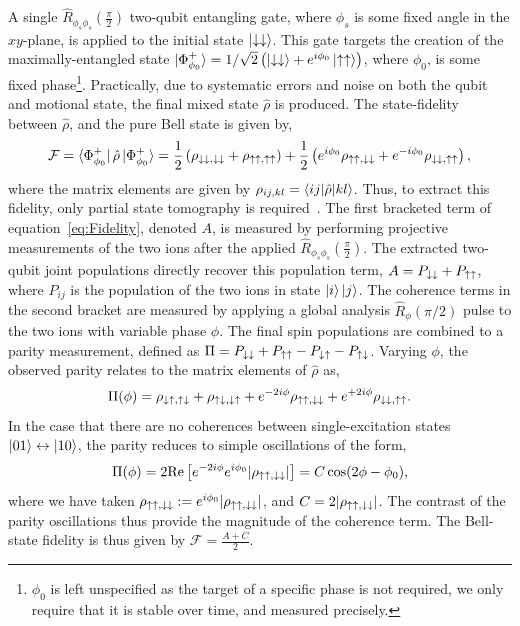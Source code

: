     A single $\hat R_{\phi_s\phi_s}(\frac{\pi}{2})$ two-qubit entangling gate, where
    $\phi_s$ is some fixed angle in the $xy$-plane, is applied to the initial
    state $\ket{\downarrow\downarrow}$. This gate targets the creation of the 
    maximally-entangled state $\ket{\Phi^+_{\phi_0}} = 1/\sqrt{2} \left( \ket{\downarrow\downarrow} +
    e^{i\phi_0}\ket{\uparrow\uparrow} \right)$, where $\phi_0$, is some fixed
    phase\footnote{$\phi_0$ is left unspecified as the target of a specific
    phase is not required, we only require that it is stable over time, and
    measured precisely.}. Practically, due to systematic errors and noise on
    both the qubit and motional state, the final mixed state $\hat\rho$ is produced.
    The state-fidelity between $\hat\rho$, and the pure Bell state is
    given by,
    \begin{equation}
        \mathcal{F} = \bra{\Phi^+_{\phi_0}} \hat\rho \ket{\Phi^+_{\phi_0}} = \frac{1}{2} \left( \rho_{\downarrow\downarrow,\downarrow\downarrow} + \rho_{\uparrow\uparrow,\uparrow\uparrow} \right) + \frac{1}{2}\left( e^{i\phi_0}\rho_{\uparrow\uparrow,\downarrow\downarrow}+e^{-i\phi_0}\rho_{\downarrow\downarrow,\uparrow\uparrow}\right),
        \label{eq:Fidelity}
    \end{equation}
    where the matrix elements are given by $\rho_{ij,kl} = \braket{ij|\hat\rho|kl}$.
    Thus, to extract this fidelity, only partial state tomography is
    required~\cite{sackett_experimental_2000}.
    The first bracketed term of
    equation~\ref{eq:Fidelity}, denoted $A$, is measured by performing projective measurements
    of the two ions after the applied $\hat R_{\phi_s\phi_s}(\frac{\pi}{2})$. The extracted
    two-qubit joint populations directly recover this population term, $A=
    P_{\downarrow\downarrow} + P_{\uparrow\uparrow}$, where $P_{ij}$ is the population of the two ions
    in state $\ket{i}\ket{j}$.
    The coherence terms in the second bracket are measured by applying a global analysis
    $\hat R_\phi(\pi/2)$ pulse to the two ions with variable phase $\phi$. The final
    spin populations are combined to a parity measurement, defined as $\Pi =
    P_{\downarrow\downarrow} + P_{\uparrow\uparrow} - P_{\downarrow\uparrow} - P_{\uparrow\downarrow}$. Varying $\phi$, the
    observed parity relates to the matrix elements of $\hat\rho$ as,
    \begin{equation}
        \Pi(\phi) = \rho_{\downarrow\uparrow,\uparrow\downarrow}+\rho_{\uparrow\downarrow,\downarrow\uparrow} + e^{-2i\phi}\rho_{\uparrow\uparrow,\downarrow\downarrow} + e^{+2i\phi}\rho_{\downarrow\downarrow,\uparrow\uparrow}.
    \end{equation}
    In the case that there are no coherences between single-excitation states
    $\ket{01}\leftrightarrow\ket{10}$, the parity reduces to simple oscillations
    of the form,
    \begin{equation}
        \Pi(\phi) =  2\mathrm{Re}\left[e^{-2i\phi}e^{i\phi_0}|\rho_{\uparrow\uparrow,\downarrow\downarrow}|\right]=C\cos(2\phi-\phi_0),
    \end{equation}
    where we have taken $\rho_{\uparrow\uparrow,\downarrow\downarrow} :=
    e^{i\phi_0}|\rho_{\uparrow\uparrow,\downarrow\downarrow}|$, and $C=2|\rho_{\uparrow\uparrow,\downarrow\downarrow}|$. The
    contrast of the parity oscillations thus provide the magnitude of the
    coherence term.
    The Bell-state fidelity is thus given by $\mathcal{F} = \frac{A + C}{2}$.\\

